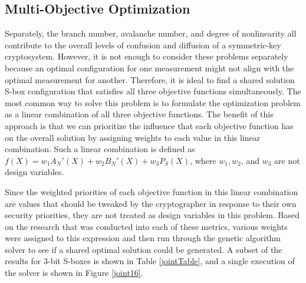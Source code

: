 \documentclass[11pt]{article}
\begin{document}
\subsection{Multi-Objective Optimization}
Separately, the branch number, avalanche number, and degree of nonlinearity all contribute to the overall levels of confusion and diffusion of a symmetric-key cryptosystem. However, it is not enough to consider these problems separately because an optimal configuration for one measurement might not align with the optimal measurement for another. Therefore, it is ideal to find a shared solution S-box configuration that satisfies all three objective functions simultaneously. The most common way to solve this problem is to formulate the optimization problem as a linear combination of all three objective functions. The benefit of this approach is that we can prioritize the influence that each objective function has on the overall solution by assigning weights to each value in this linear combination. Such a linear combination is defined as $f(X) = w_1A_N'(X) + w_2B_N'(X) + w_3P_S(X)$, where $w_1, w_2$, and $w_3$ are not design variables. 

Since the weighted priorities of each objective function in this linear combination are values that should be tweaked by the cryptographer in response to their own security priorities, they are not treated as design variables in this problem. Based on the research that was conducted into each of these metrics, various weights were assigned to this expression and then run through the genetic algorithm solver to see if a shared optimal solution could be generated. A subset of the results for $3$-bit S-boxes is shown in Table \ref{jointTable}, and a single execution of the solver is shown in Figure \ref{joint16}.
\end{document}
